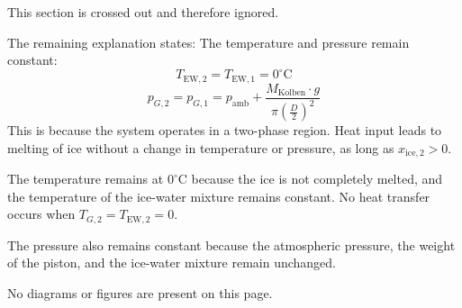 This section is crossed out and therefore ignored.  

The remaining explanation states:  
The temperature and pressure remain constant:  
\[
T_{\text{EW},2} = T_{\text{EW},1} = 0^\circ \text{C}
\]  
\[
p_{G,2} = p_{G,1} = p_{\text{amb}} + \frac{M_{\text{Kolben}} \cdot g}{\pi \left(\frac{D}{2}\right)^2}
\]  
This is because the system operates in a two-phase region. Heat input leads to melting of ice without a change in temperature or pressure, as long as \( x_{\text{ice},2} > 0 \).  

The temperature remains at \( 0^\circ \text{C} \) because the ice is not completely melted, and the temperature of the ice-water mixture remains constant. No heat transfer occurs when \( T_{G,2} = T_{\text{EW},2} = 0 \).  

The pressure also remains constant because the atmospheric pressure, the weight of the piston, and the ice-water mixture remain unchanged.  

No diagrams or figures are present on this page.